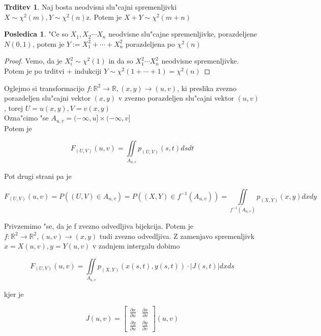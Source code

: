 \documentclass[a4paper,12pt]{article}
\theoremstyle{definition}
\newtheorem{conseq}[counter]{Posledica}
\newtheorem{claim}[counter]{Trditev}
\theoremstyle{remark}
\newcommand{\R}{\mathbb{R}}
\begin{document}
\begin{claim}
    Naj bosta neodvisni slu"cajni spremenljivki $X \sim \chi^2(m), Y \sim \chi^2(n)$z. Potem je
    $X + Y \sim \chi^2(m+n)$
\end{claim}




\begin{conseq}
    "Ce so $X_1, X_2 \cdots X_n$ neodvisne slu"cajne spremenljivke, porazdeljene $N(0,1)$, potem je
    $Y := X_1^2 + \cdots + X_n^2$ porazdeljena po $\chi^2(n)$
\end{conseq}

\begin{proof}
    Vemo, da je $X_i^2 \sim \chi^2(1)$ in da so $X_1^2 \cdots X_n^2$ neodvisne spremenljivke. Potem je po trditvi
    + indukciji $Y \sim \chi^2(1 + \cdots + 1) = \chi^2(n)$
\end{proof}

Oglejmo si transformacijo $f: \R^2 \to \R, (x,y) \to (u,v)$, ki preslika zvezno porazdeljen slu"cajni vektor $(x,y)$ v
zvezno porazdeljen slu"cajni vektor $(u,v)$, torej $U = u(x,y), V = v(x,y)$ \\
Ozna"cimo "se $A_{u,v} = (-\infty,u] \times (-\infty,v]$ \\
Potem je

\begin{equation*}
    F_{(U,V)}(u,v) = \underset{A_{u,v}}{\iint} p_{(U,V)}(s,t) ds dt
\end{equation*}\label{eqn:Auv}

Pot drugi strani pa je

\begin{equation*}
    F_{(U,V)}(u,v) = P((U,V) \in A_{u,v}) = P((X,Y) \in f^{-1}(A_{u,v})) = \underset{f^{-1}(A_{u,v})}{\iint}
    p_{(X,Y)}(x,y) dx dy
\end{equation*}

Privzemimo "se, da je f zvezno odvedljiva bijekcija. Potem je $f: \R^2 \to \R^2, (u,v) \to (x,y)$ tudi zvezno
odvedljiva. Z zamenjavo spremenljivk $x = X(u,v), y = Y(u,v)$ v zadnjem intergalu dobimo

\begin{equation*}
    F_{(U,V)}(u,v) = \underset{A_{u,v}}{\iint} p_{(X,Y)}(x(s,t),y(s,t)) \cdot |J(s,t)| dx ds
\end{equation*}

kjer je

\begin{equation*}
    J(u,v) = \begin{bmatrix}
        \frac{\partial x}{\partial u} & \frac{\partial x}{\partial v} \\
        \frac{\partial y}{\partial u} & \frac{\partial y}{\partial v}
    \end{bmatrix}(u,v)
\end{equation*}
\end{document}
